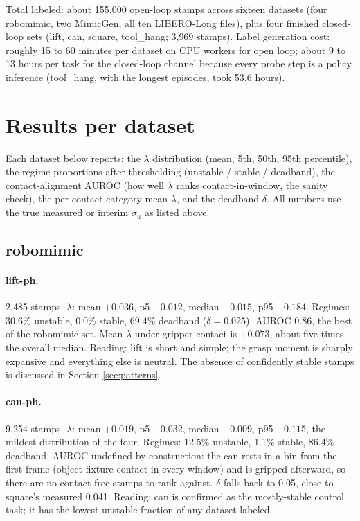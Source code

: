 \documentclass[11pt]{article}
\begin{document}
Total labeled: about 155{,}000 open-loop stamps across sixteen datasets (four
robomimic, two MimicGen, all ten LIBERO-Long files), plus four finished closed-loop
sets (lift, can, square, tool\_hang; 3{,}969 stamps). Label generation cost:
roughly 15 to 60 minutes per dataset on CPU workers for open loop; about 9 to 13
hours per task for the closed-loop channel because every probe step is a policy
inference (tool\_hang, with the longest episodes, took 53.6 hours).

\section{Results per dataset}

Each dataset below reports: the $\lambda$ distribution (mean, 5th, 50th, 95th
percentile), the regime proportions after thresholding (unstable / stable /
deadband), the contact-alignment AUROC (how well $\lambda$ ranks
contact-in-window, the sanity check), the per-contact-category mean $\lambda$, and
the deadband $\delta$. All numbers use the true measured or interim $\sigma_u$ as
listed above.

\subsection{robomimic}

\paragraph{lift-ph.}
2{,}485 stamps. $\lambda$: mean $+0.036$, p5 $-0.012$, median $+0.015$, p95
$+0.184$. Regimes: 30.6\% unstable, 0.0\% stable, 69.4\% deadband
($\delta = 0.025$). AUROC 0.86, the best of the robomimic set. Mean $\lambda$ under
gripper contact is $+0.073$, about five times the overall median. Reading: lift is
short and simple; the grasp moment is sharply expansive and everything else is
neutral. The absence of confidently stable stamps is discussed in Section
\ref{sec:patterns}.

\paragraph{can-ph.}
9{,}254 stamps. $\lambda$: mean $+0.019$, p5 $-0.032$, median $+0.009$, p95
$+0.115$, the mildest distribution of the four. Regimes: 12.5\% unstable, 1.1\%
stable, 86.4\% deadband. AUROC undefined by construction: the can rests in a bin
from the first frame (object-fixture contact in every window) and is gripped
afterward, so there are no contact-free stamps to rank against. $\delta$ falls back
to 0.05, close to square's measured 0.041. Reading: can is confirmed as the
mostly-stable control task; it has the lowest unstable fraction of any dataset
labeled.
\end{document}
